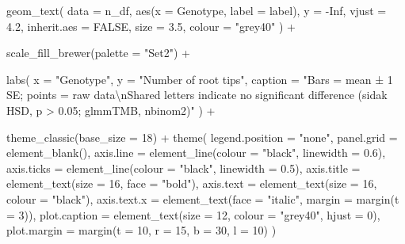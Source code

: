 \documentclass[
  letterpaper,
  DIV=11,
  numbers=noendperiod]{scrartcl}
\newenvironment{Shaded}{\begin{snugshade}}{\end{snugshade}}
\newcommand{\AttributeTok}[1]{\textcolor[rgb]{0.40,0.45,0.13}{#1}}
\newcommand{\ConstantTok}[1]{\textcolor[rgb]{0.56,0.35,0.01}{#1}}
\newcommand{\DecValTok}[1]{\textcolor[rgb]{0.68,0.00,0.00}{#1}}
\newcommand{\FloatTok}[1]{\textcolor[rgb]{0.68,0.00,0.00}{#1}}
\newcommand{\FunctionTok}[1]{\textcolor[rgb]{0.28,0.35,0.67}{#1}}
\newcommand{\NormalTok}[1]{\textcolor[rgb]{0.00,0.23,0.31}{#1}}
\newcommand{\SpecialCharTok}[1]{\textcolor[rgb]{0.37,0.37,0.37}{#1}}
\newcommand{\StringTok}[1]{\textcolor[rgb]{0.13,0.47,0.30}{#1}}
\newcounter{none} %
\begin{document}
\begin{Shaded}
\begin{Highlighting}[]
  \FunctionTok{geom\_text}\NormalTok{(}
    \AttributeTok{data        =}\NormalTok{ n\_df,}
    \FunctionTok{aes}\NormalTok{(}\AttributeTok{x =}\NormalTok{ Genotype, }\AttributeTok{label =}\NormalTok{ label),}
    \AttributeTok{y           =} \SpecialCharTok{{-}}\ConstantTok{Inf}\NormalTok{,}
    \AttributeTok{vjust       =} \FloatTok{4.2}\NormalTok{,}
    \AttributeTok{inherit.aes =} \ConstantTok{FALSE}\NormalTok{,}
    \AttributeTok{size        =} \FloatTok{3.5}\NormalTok{,}
    \AttributeTok{colour      =} \StringTok{"grey40"}
\NormalTok{  ) }\SpecialCharTok{+}

  \FunctionTok{scale\_fill\_brewer}\NormalTok{(}\AttributeTok{palette =} \StringTok{"Set2"}\NormalTok{) }\SpecialCharTok{+}

  \FunctionTok{labs}\NormalTok{(}
    \AttributeTok{x       =} \StringTok{"Genotype"}\NormalTok{,}
    \AttributeTok{y       =} \StringTok{"Number of root tips"}\NormalTok{,}
    \AttributeTok{caption =} \StringTok{"Bars = mean ± 1 SE; points = raw data}\SpecialCharTok{\textbackslash{}n}\StringTok{Shared letters indicate no significant difference (sidak HSD, p \textgreater{} 0.05; glmmTMB, nbinom2)"}
\NormalTok{  ) }\SpecialCharTok{+}

  \FunctionTok{theme\_classic}\NormalTok{(}\AttributeTok{base\_size =} \DecValTok{18}\NormalTok{) }\SpecialCharTok{+}
  \FunctionTok{theme}\NormalTok{(}
    \AttributeTok{legend.position =} \StringTok{"none"}\NormalTok{,}
    \AttributeTok{panel.grid      =} \FunctionTok{element\_blank}\NormalTok{(),}
    \AttributeTok{axis.line       =} \FunctionTok{element\_line}\NormalTok{(}\AttributeTok{colour =} \StringTok{"black"}\NormalTok{, }\AttributeTok{linewidth =} \FloatTok{0.6}\NormalTok{),}
    \AttributeTok{axis.ticks      =} \FunctionTok{element\_line}\NormalTok{(}\AttributeTok{colour =} \StringTok{"black"}\NormalTok{, }\AttributeTok{linewidth =} \FloatTok{0.5}\NormalTok{),}
    \AttributeTok{axis.title      =} \FunctionTok{element\_text}\NormalTok{(}\AttributeTok{size =} \DecValTok{16}\NormalTok{, }\AttributeTok{face =} \StringTok{"bold"}\NormalTok{),}
    \AttributeTok{axis.text       =} \FunctionTok{element\_text}\NormalTok{(}\AttributeTok{size =} \DecValTok{16}\NormalTok{, }\AttributeTok{colour =} \StringTok{"black"}\NormalTok{),}
    \AttributeTok{axis.text.x     =} \FunctionTok{element\_text}\NormalTok{(}\AttributeTok{face =} \StringTok{"italic"}\NormalTok{, }\AttributeTok{margin =} \FunctionTok{margin}\NormalTok{(}\AttributeTok{t =} \DecValTok{3}\NormalTok{)),}
    \AttributeTok{plot.caption    =} \FunctionTok{element\_text}\NormalTok{(}\AttributeTok{size =} \DecValTok{12}\NormalTok{, }\AttributeTok{colour =} \StringTok{"grey40"}\NormalTok{, }\AttributeTok{hjust =} \DecValTok{0}\NormalTok{),}
    \AttributeTok{plot.margin     =} \FunctionTok{margin}\NormalTok{(}\AttributeTok{t =} \DecValTok{10}\NormalTok{, }\AttributeTok{r =} \DecValTok{15}\NormalTok{, }\AttributeTok{b =} \DecValTok{30}\NormalTok{, }\AttributeTok{l =} \DecValTok{10}\NormalTok{)}
\NormalTok{  )}


\end{Highlighting}
\end{Shaded}
\end{document}
